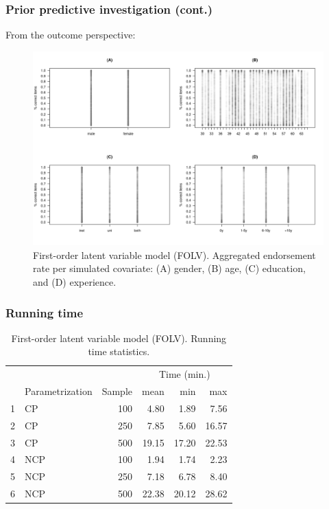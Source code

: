 \documentclass[arial,12pt,xcolor=dvipsnames]{beamer}
\begin{document}
%
\begin{frame}
	\frametitle{Prior predictive investigation (cont.)}
	From the outcome perspective:
	\begin{figure}[h]
		\centering
		\includegraphics[width=0.65\linewidth]{FOLV_HitRate2}
		\caption{First-order latent variable model (FOLV). Aggregated endorsement rate per simulated covariate: (A) gender, (B) age, (C) education, and (D) experience.}
		\label{fig:FOLV_hitrate2}
	\end{figure}
\end{frame}
%
\begin{frame}
	\frametitle{Running time }
	\begin{table}[h]
		\centering
		\begin{tabular}{rlrrrr}
			\hline
			\multicolumn{3}{c}{ }& \multicolumn{3}{c}{ Time (min.) } \\ 
			\cmidrule(rl){4-6} 
			& Parametrization & Sample & mean & min & max \\ 
			\hline\hline
			1 & CP & 100 & 4.80 & 1.89 & 7.56 \\ 
			2 & CP & 250 & 7.85 & 5.60 & 16.57 \\ 
			3 & CP & 500 & 19.15 & 17.20 & 22.53 \\ 
			\hline
			4 & NCP & 100 & 1.94 & 1.74 & 2.23 \\ 
			5 & NCP & 250 & 7.18 & 6.78 & 8.40 \\ 
			6 & NCP & 500 & 22.38 & 20.12 & 28.62 \\
			\hline
		\end{tabular}
		\caption{First-order latent variable model (FOLV). Running time statistics.} 
		\label{tab:FOLV_time}
	\end{table}
\end{frame}
%
\end{document}
